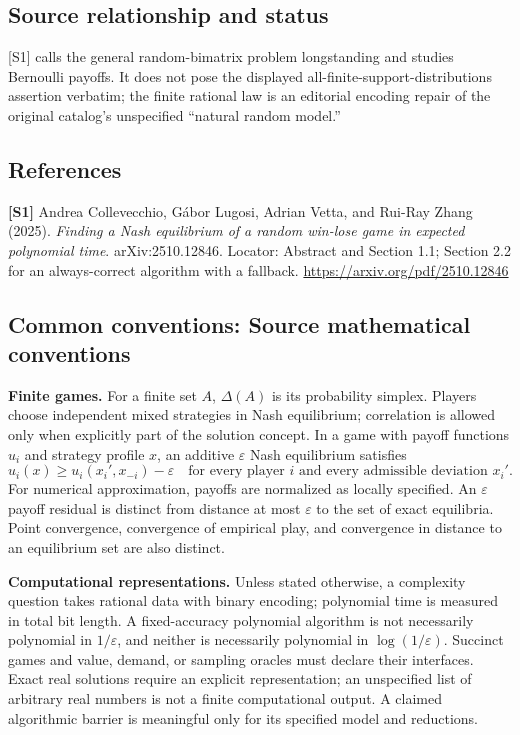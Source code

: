 \documentclass[11pt,a4paper]{article}
\begin{document}
\subsection*{Source relationship and status}
[S1] calls the general random-bimatrix problem longstanding and studies Bernoulli payoffs. It does not pose the displayed all-finite-support-distributions assertion verbatim; the finite rational law is an editorial encoding repair of the original catalog's unspecified ``natural random model.''
\subsection*{References}
\begingroup\footnotesize\raggedright
{\footnotesize\raggedright
\textbf{[S1]} Andrea Collevecchio, G\'abor Lugosi, Adrian Vetta, and Rui-Ray Zhang (2025). \emph{Finding a Nash equilibrium of a random win-lose game in expected polynomial time}. arXiv:2510.12846. Locator: Abstract and Section 1.1; Section 2.2 for an always-correct algorithm with a fallback. \url{https://arxiv.org/pdf/2510.12846}\par}
\par\endgroup

\subsection*{Common conventions: Source mathematical conventions}

\textbf{Finite games.} For a finite set $A$, $\Delta(A)$ is its probability
simplex. Players choose independent mixed strategies in Nash equilibrium;
correlation is allowed only when explicitly part of the solution concept.
In a game with payoff functions $u_i$ and strategy profile $x$, an additive
$\varepsilon$ Nash equilibrium satisfies
\[
 u_i(x)\geq u_i(x_i',x_{-i})-\varepsilon
 \quad\text{for every player $i$ and every admissible deviation $x_i'$}.
\]
For numerical approximation, payoffs are normalized as locally specified.
An $\varepsilon$ payoff residual is distinct from distance at most
$\varepsilon$ to the set of exact equilibria. Point convergence, convergence
of empirical play, and convergence in distance to an equilibrium set are
also distinct.

\textbf{Computational representations.} Unless stated otherwise, a complexity
question takes rational data with binary encoding; polynomial time is measured
in total bit length. A fixed-accuracy polynomial algorithm is not necessarily
polynomial in $1/\varepsilon$, and neither is necessarily polynomial in
$\log(1/\varepsilon)$. Succinct games and value, demand, or sampling oracles
must declare their interfaces. Exact real solutions require an explicit
representation; an unspecified list of arbitrary real numbers is not a
finite computational output. A claimed algorithmic barrier is meaningful
only for its specified model and reductions.
\end{document}
